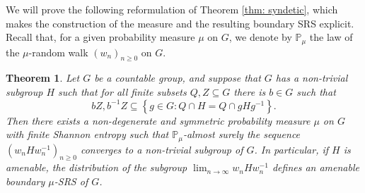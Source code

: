 \documentclass[reqno,a4paper,11pt]{amsart}
\numberwithin{equation}{section}
\newcommand{\1}{\mathbf{1}}
\def\P{{\mathbb P}}
\newtheorem{teo}{Theorem}[section]
\theoremstyle{definition}
\begin{document}
	We will prove the following reformulation of Theorem \ref{thm: syndetic}, which makes the construction of the measure and the resulting boundary SRS explicit. Recall that, for a given probability measure $\mu$ on $G$, we denote by $\P_\mu$ the law of the $\mu$-random walk $(w_n)_{n\ge 0}$ on $G$.
	\begin{teo}
		Let $G$ be a countable group, and suppose that $G$ has a non-trivial subgroup $H$ such that for all finite subsets $Q, Z \subseteq G$ there is $b \in G$ such that
		\[
		bZ,b^{-1}Z\subseteq \left \{g \in G : Q \cap H = Q \cap gHg^{-1}\right \}.
		\]
		Then there exists a non-degenerate and symmetric probability measure $\mu$ on $G$ with finite Shannon entropy such that $\P_\mu$-almost surely the sequence $(w_nHw_n^{-1})_{n \geq 0}$ converges to a non-trivial subgroup of $G$. In particular, if $H$ is amenable, the distribution of the subgroup $\lim_{n\to \infty}w_n H w_n^{-1}$ defines an amenable boundary $\mu$-SRS of $G$.
	\end{teo} 
\end{document}
